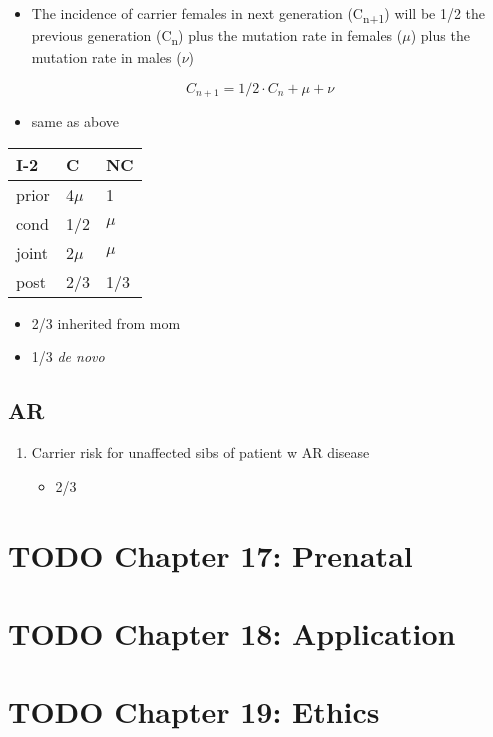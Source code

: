 \documentclass[12pt]{scrartcl}
\begin{document}
\begin{enumerate}
\begin{itemize}
\item The incidence of carrier females in next generation (C\textsubscript{n+1}) will
be 1/2 the previous generation (C\textsubscript{n}) plus the mutation rate in
females (\(\mu\)) plus the mutation rate in males (\(\nu\))
\end{itemize}

\[C_{n+1} = 1/2 \cdot C_n + \mu + \nu \]

\begin{itemize}
\item same as above
\end{itemize}

\begin{center}
\begin{tabular}{lll}
I-2 & C & NC\\
\hline
prior & 4\(\mu\) & 1\\
cond \footnotemark & 1/2 & \(\mu\)\\
joint & 2\(\mu\) & \(\mu\)\\
post & 2/3 & 1/3\\
\end{tabular}
\end{center}


\begin{itemize}
\item 2/3 inherited from mom
\item 1/3 \emph{de novo}
\end{itemize}
\end{enumerate}
\subsection{AR}
\label{sec:orga2d2eb4}
\begin{enumerate}
\item Carrier risk for unaffected sibs of patient w AR disease
\label{sec:orgd52f66d}
\begin{itemize}
\item 2/3
\end{itemize}
\end{enumerate}

\section{{\bfseries\sffamily TODO} Chapter 17: Prenatal}
\label{sec:org5863834}
\section{{\bfseries\sffamily TODO} Chapter 18: Application}
\label{sec:orgf51f6e9}
\section{{\bfseries\sffamily TODO} Chapter 19: Ethics}
\label{sec:org3df288a}
\end{document}
